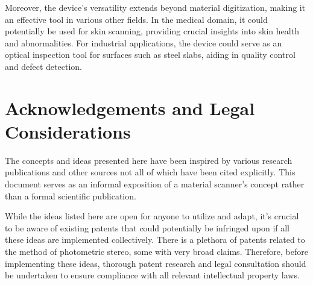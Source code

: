 \documentclass[11pt, twoside, listof=totocnumbered, bibliography=totocnumbered]{scrartcl}
\begin{document}
Moreover, the device's versatility extends beyond material digitization, making it an effective tool in various other fields. In the medical domain, it could potentially be used for skin scanning, providing crucial insights into skin health and abnormalities. For industrial applications, the device could serve as an optical inspection tool for surfaces such as steel slabs, aiding in quality control and defect detection.

\section{Acknowledgements and Legal Considerations}
The concepts and ideas presented here have been inspired by various research publications and other sources not all of which have been cited explicitly. This document serves as an informal exposition of a material scanner's concept rather than a formal scientific publication.

While the ideas listed here are open for anyone to utilize and adapt, it's crucial to be aware of existing patents that could potentially be infringed upon if all these ideas are implemented collectively. There is a plethora of patents related to the method of photometric stereo, some with very broad claims. Therefore, before implementing these ideas, thorough patent research and legal consultation should be undertaken to ensure compliance with all relevant intellectual property laws.

\newpage
\end{document}
